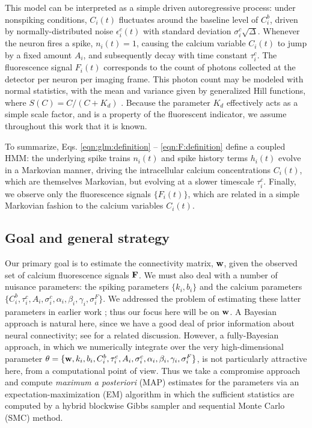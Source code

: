 This model can be interpreted as a simple driven autoregressive process: under nonspiking conditions, $C_i(t)$ fluctuates around the baseline level of $C_i^b$, driven by normally-distributed noise $\epsilon^c_i(t)$ with standard deviation $\sigma^c_i \sqrt{\Delta}$. Whenever the neuron fires a spike, $n_i(t)=1$, causing the calcium variable $C_i(t)$ to jump by a fixed amount $A_i$, and subsequently decay with time constant $\tau^c_i$. The fluorescence signal $F_i(t)$ corresponds to the count of photons collected at the detector per neuron per imaging frame. This photon count may be modeled with normal statistics, with the mean and variance given by generalized Hill functions, where $S(C)=C/(C+K_d)$ \cite{Yasuda2004}. Because the parameter $K_d$ effectively acts as a simple scale factor, and is a property of the fluorescent indicator, we assume throughout this work that it is known.

To summarize, Eqs. \ref{eqn:glm:definition} -- \ref{eqn:F:definition} define a coupled HMM: the underlying spike trains $n_i(t)$ and spike history terms $h_i(t)$ evolve in a Markovian manner, driving the intracellular calcium concentrations $C_i(t)$, which are themselves Markovian, but evolving at a slower timescale $\tau_i^c$. Finally, we observe only the fluorescence signals $\{F_i(t)\}$, which are related in a simple Markovian fashion to the calcium variables $C_i(t)$.


\subsection{Goal and general strategy}  \label{sec:methods:goal}

Our primary goal is to estimate the connectivity matrix, $\mathbf{w}$, given the observed set of calcium fluorescence signals ${\bf F}$. We must also deal with a number of nuisance parameters: the spiking parameters $\{k_i, b_i\}$ and the calcium parameters $\{C^b_i, \tau^c_i, A_i, \sigma^c_i, \alpha_i, \beta_i, \gamma_i, \sigma^F_i\}$. We addressed the problem of estimating these latter parameters in earlier work \cite{Vogelstein2009}; thus our focus here will be on $\mathbf{w}$. A Bayesian approach is natural here, since we have a good deal of prior information about neural connectivity; see \cite{Rigat06} for a related discussion. However, a fully-Bayesian approach, in which we numerically integrate over the very high-dimensional parameter $\theta = \{\mathbf{w}, k_i, b_i, C^b_i, \tau^c_i, A_i, \sigma^c_i, \alpha_i, \beta_i, \gamma_i, \sigma^F_i\}$, is not particularly attractive here, from a computational point of view. Thus we take a compromise approach and compute \emph{maximum a posteriori} (MAP) estimates for the parameters via an expectation-maximization (EM) algorithm in which the sufficient statistics are computed by a hybrid blockwise Gibbs sampler and sequential Monte Carlo (SMC) method.

